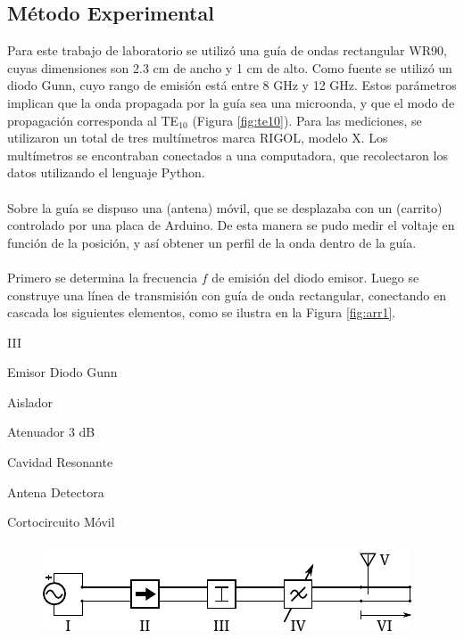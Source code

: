 \documentclass[11pt,a4paper]{article}
\begin{document}
\begin{multicols}{2}
\section{Método Experimental}
Para este trabajo de laboratorio se utilizó una guía de ondas rectangular WR90, cuyas dimensiones son 2.3 cm de ancho y 1 cm de alto. Como fuente se utilizó un diodo Gunn, cuyo rango de emisión está entre 8 GHz y 12 GHz. Estos parámetros implican que la onda propagada por la guía sea una microonda, y que el modo de propagación corresponda al TE$_{10}$ (Figura \ref{fig:te10}). Para las mediciones, se utilizaron un total de tres multímetros marca RIGOL, modelo X. Los multímetros se encontraban conectados a una computadora, que recolectaron los datos utilizando el lenguaje Python.\\ \\
Sobre la guía se dispuso una (antena) móvil, que se desplazaba con un (carrito) controlado por una placa de Arduino. De esta manera se pudo medir el voltaje en función de la posición, y así obtener un perfil de la onda dentro de la guía.
\\ \\
Primero se determina la frecuencia $f$ de emisión del diodo emisor. Luego se construye una línea de transmisión con guía de onda rectangular, conectando en cascada los siguientes elementos, como se ilustra en la Figura \ref{fig:arr1}.
\begin{multicols}{2}
    \begin{labeling}{III} 
        \item [I] Emisor Diodo Gunn
        \item [II] Aislador
        \item [III] Atenuador 3 dB
        \item [IV] Cavidad Resonante
        \item [V] Antena Detectora
        \item [VI] Cortocircuito Móvil
    \end{labeling}        
\end{multicols}
\begin{figure}[H]
    \centering
    \includegraphics[width=\linewidth]{Images/arreglo1.pdf}

\end{figure}
\end{multicols}
\end{document}
